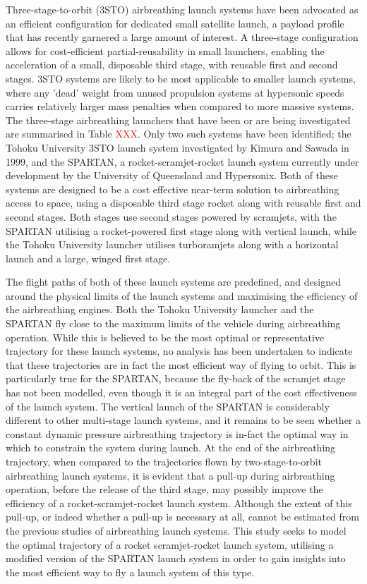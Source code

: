 Three-stage-to-orbit (3STO) airbreathing launch systems have been advocated as an efficient configuration for dedicated small satellite launch, a payload profile that has recently garnered a large amount of interest. A three-stage configuration allows for cost-efficient partial-reusability in small launchers, enabling the acceleration of a small, disposable third stage, with reusable first and second stages. 
3STO systems are likely to be most applicable to smaller launch systems, where any 'dead' weight from unused propulsion systems at hypersonic speeds carries relatively larger mass penalties when compared to more massive systems. 
The three-stage airbreathing launchers that have been or are being investigated are summarised in Table \textcolor{red}{XXX}. Only two such systems have been identified; the Tohoku University 3STO launch system investigated by Kimura and Sawada in 1999\cite{Kimura1999}, and the SPARTAN, a rocket-scramjet-rocket launch system currently under development by the University of Queensland and Hypersonix. Both of these systems are designed to be a cost effective near-term solution to airbreathing access to space, using a disposable third stage rocket along with reusable first and second stages. Both stages use second stages powered by scramjets, with the SPARTAN utilising a rocket-powered first stage along with vertical launch, while the Tohoku University launcher utilises turboramjets along with a horizontal launch and a large, winged first stage. 

 The flight paths of both of these launch systems are predefined, and designed around the physical limits of the launch systems and maximising the efficiency of the airbreathing engines. Both the Tohoku University launcher and the SPARTAN fly close to the maximum limits of the vehicle during airbreathing operation.
While this is believed to be the most optimal or representative trajectory for these launch systems, no analysis has been undertaken to indicate that these trajectories are in fact the most efficient way of flying to orbit. This is particularly true for the SPARTAN, because the fly-back of the scramjet stage has not been modelled, even though it is an integral part of the cost effectiveness of the launch system. 
The vertical launch of the SPARTAN is considerably different to other multi-stage launch systems, and it remains to be seen whether a constant dynamic pressure airbreathing trajectory is in-fact the optimal way in which to constrain the system during launch. 
At the end of the airbreathing trajectory, when compared to the trajectories flown by two-stage-to-orbit airbreathing launch systems, it is evident that a pull-up during airbreathing operation, before the release of the third stage, may possibly improve the efficiency of a rocket-scramjet-rocket launch system. Although the extent of this pull-up, or indeed whether a pull-up is necessary at all, cannot be estimated from the previous studies of airbreathing launch systems.
This study seeks to model the optimal trajectory of a rocket scramjet-rocket launch system, utilising a modified version of the SPARTAN launch system in order to gain insights into the most efficient way to fly a launch system of this type. 




